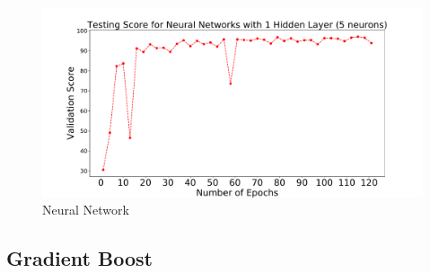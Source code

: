 \begin{figure}[h]
\includegraphics[width=\onepic\textwidth]{plots/epochsvsscore1_10seeds_1layer_5.pdf}
\caption{
Neural Network
}
\label{fig:Maps_data}
\end{figure}	

\subsection{Gradient Boost}




